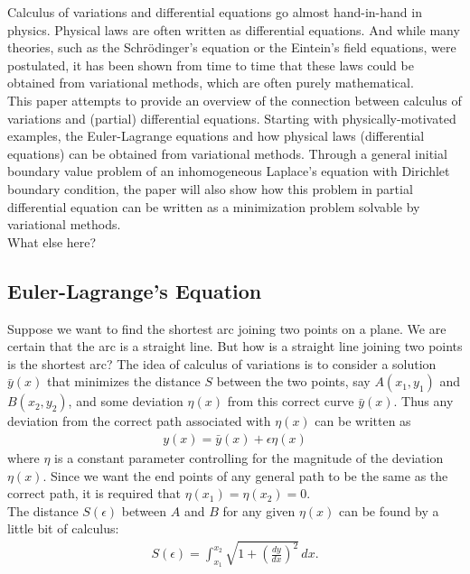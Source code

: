 \documentclass{article}
\begin{document}
Calculus of variations and differential equations go almost hand-in-hand in physics. Physical laws are often written as differential equations. And while many theories, such as the Schr\"{o}dinger's equation or the Eintein's field equations, were postulated, it has been shown from time to time that these laws could be obtained from variational methods, which are often purely mathematical. \\


This paper attempts to provide an overview of the connection between calculus of variations and (partial) differential equations. Starting with physically-motivated examples, the Euler-Lagrange equations and how physical laws (differential equations) can be obtained from variational methods. Through a general initial boundary value problem of an inhomogeneous Laplace's equation with Dirichlet boundary condition, the paper will also show how this problem in partial differential equation can be written as a minimization problem solvable by variational methods. \\


What else here?


\subsection{Euler-Lagrange's Equation}

Suppose we want to find the shortest arc joining two points on a plane. We are certain that the arc is a straight line. But how is a straight line joining two points is the shortest arc? The idea of calculus of variations is to consider a solution $\bar{y}(x)$ that minimizes the distance $S$ between the two points, say $A(x_1,y_1)$ and $B(x_2,y_2)$, and some deviation $\eta(x)$ from this correct curve $\bar{y}(x)$. Thus any deviation from the correct path associated with $\eta(x)$ can be written as
\begin{align}
y(x) = \bar{y}(x) + \epsilon \eta(x)
\end{align}
where $\eta$ is a constant parameter controlling for the magnitude of the deviation $\eta(x)$. Since we want the end points of any general path to be the same as the correct path, it is required that $\eta(x_1) = \eta(x_2) = 0$.\\

The distance $S(\epsilon)$ between $A$ and $B$ for any given $\eta(x)$ can be found by a little bit of calculus:
\begin{align}
S(\epsilon) = \int^{x_2}_{x_1}\sqrt{1 + \left(\frac{dy}{dx}\right)^2}\,dx.
\end{align}
\end{document}

